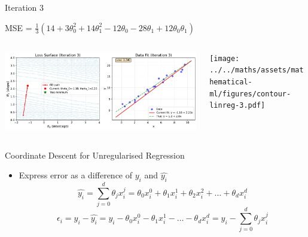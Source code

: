 \documentclass{beamer}
\begin{document}
\begin{frame}{Iteration 3}

MSE = $\frac{1}{3}(14+3\theta_{0}^{2}+14\theta_{1}^{2}-12\theta_{0}-28\theta_{1}+12\theta_{0}\theta_{1})$\\

\begin{columns}
\begin{column}{0.6\textwidth}
\begin{adjustbox}{max totalsize={\textwidth},center}
\includegraphics[width=\textwidth]{../../maths/assets/mathematical-ml/figures/gradient-descent-3.pdf}
\end{adjustbox}

\end{column}
\begin{column}{0.5\textwidth}
\begin{adjustbox}{max totalsize={\textwidth},center}
\texttt{[image: ../../maths/assets/mathematical-ml/figures/contour-linreg-3.pdf]}
\end{adjustbox}
\end{column}
\end{columns}


\end{frame}


%


\begin{frame}{Coordinate Descent for Unregularised Regression}

\begin{itemize}[<+->]
	
	
	
	
	
	\item Express error as a difference of $y_{i}$ and $\hat{y_{i}}$
	\begin{equation}
	\hat{y_i} = \sum_{j=0}^{d} \theta_{j}x^{j}_{i} = \theta_{0}x_{i}^{0} + \theta_{1}x_{i}^{1} +\theta_{2}x_{i}^{2} + \ldots + \theta_{d}x_{i}^{d}
	\end{equation}
	\begin{equation}
	\epsilon_{i} = y_{i} - \hat{y_{i}} = y_{i} - \theta_{0}x_{i}^{0} - \theta_{1}x_{i}^{1} - \ldots - \theta_{d}x_{i}^{d} = y_{i} - \sum_{j=0}^{d} \theta_{j}x_{i}^{j}
	\end{equation}
	
	
	
\end{itemize}


\end{frame}
\end{document}
